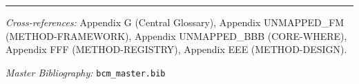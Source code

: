 \nocite{bcm_master}



\vspace{1em}
\hrule
\vspace{0.5em}

\noindent\textit{Cross-references:}
Appendix G (Central Glossary),
Appendix UNMAPPED_FM (METHOD-FRAMEWORK),
Appendix UNMAPPED_BBB (CORE-WHERE),
Appendix FFF (METHOD-REGISTRY),
Appendix EEE (METHOD-DESIGN).

\noindent\textit{Master Bibliography:} \texttt{bcm\_master.bib}


